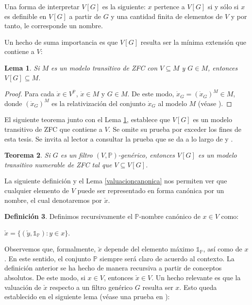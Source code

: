 \documentclass[11pt]{unam_tesis1}
\theoremstyle{MyThmStyle}
\theoremstyle{definition}
\newtheorem{definition}{Definici\'on}[chapter]
\theoremstyle{plain}
\newtheorem{theorem}[definition]{Teorema}
\newtheorem{lemma}[definition]{Lema}
\theoremstyle{remark}
\begin{document}
Una forma de interpretar $V[G]$ es la siguiente: $x$ pertence a $V[G]$ si y s\'olo si $x$ es definible en $V[G]$ a partir de $G$ y una cantidad finita de elementos de $V$ y por tanto, le corresponde un nombre.

Un hecho de suma importancia es que $V[G]$ resulta ser la m\'inima extensi\'on que contiene a $V$:

\begin{lemma}\label{minimalidad}
Si $M$ es un modelo transitivo de ZFC con $V\subseteq M$ y $G\in M$, entonces $V[G]\subseteq M$.
\end{lemma}

\begin{proof}
Para cada $\dot x\in V^{\mathbb P}$, $\dot x\in M$ y $G\in M$. De este modo, $\dot x_G=(\dot x_G)^M\in M$, donde $(\dot x_G)^M$ es la relativizaci\'on del conjunto $\dot x_G$ al modelo $M$ (v\'ease \cite[VII]{kunen}).
\end{proof}

El siguiente teorema junto con el Lema \ref{minimalidad}, establece que $V[G]$ es un modelo transitivo de ZFC que contiene a $V$. Se omite su prueba por exceder los fines de esta tesis. Se invita al lector a consultar la prueba que se da a lo largo de \cite[VII \S 2 ]{kunen} y \cite[VII Theorem 4.2]{kunen}.


\begin{theorem}\label{V[G] es modelo}
Si $G$ es un filtro $(V,\mathbb P)$-gen\'erico, entonces $V[G]$ es un modelo transitivo numerable de ZFC tal que $V\subseteq V[G]$.
\end{theorem}

La siguiente definici\'on y el Lema \ref{valuacioncanonica} nos permiten ver que cualquier elemento de $V$ puede ser representado en forma can\'onica por un nombre, el cual denotaremos por $\check{x}$.

\begin{definition}\label{nombrecanonico}
Definimos recursivamente el $\mathbb P$-nombre can\'onico de $x\in V$ como:
\begin{center}
$\check{x}=\{(\check{y},\mathds{1_{\mathbb P}}):y\in x \}$.
\end{center}
\end{definition}

Observemos que, formalmente, $\check{x}$ depende del elemento m\'aximo $\mathds 1_{\mathbb P}$, as\'i como de $x$. En este sentido, el conjunto $\mathbb P$ siempre ser\'a claro de acuerdo al contexto. La definici\'on anterior se ha hecho de manera recursiva a partir de conceptos absolutos. De este modo, si $x\in V$, entonces $\check{x}\in V$. Un hecho relevante es que la valuaci\'on de $\check{x}$ respecto a un filtro gen\'erico $G$ resulta ser $x$. Esto queda establecido en el siguiente lema (v\'ease una prueba en \cite[VII Lemma 2.11]{kunen}):
\end{document}
